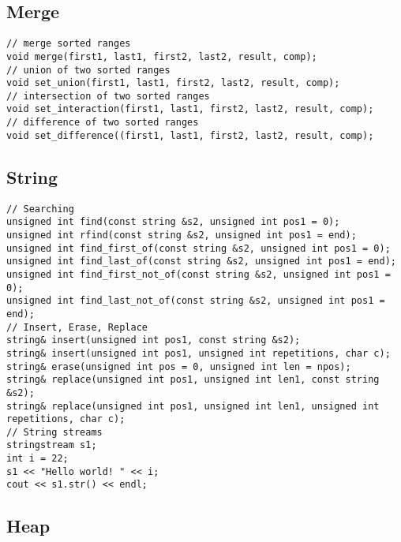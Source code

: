 \documentclass[a4paper]{article}
\begin{document}
\subsection{Merge}

\begin{verbatim}
// merge sorted ranges
void merge(first1, last1, first2, last2, result, comp);
// union of two sorted ranges
void set_union(first1, last1, first2, last2, result, comp);
// intersection of two sorted ranges
void set_interaction(first1, last1, first2, last2, result, comp);
// difference of two sorted ranges
void set_difference((first1, last1, first2, last2, result, comp);
\end{verbatim}

\subsection{String}

\begin{verbatim}
// Searching
unsigned int find(const string &s2, unsigned int pos1 = 0);
unsigned int rfind(const string &s2, unsigned int pos1 = end);
unsigned int find_first_of(const string &s2, unsigned int pos1 = 0);
unsigned int find_last_of(const string &s2, unsigned int pos1 = end);
unsigned int find_first_not_of(const string &s2, unsigned int pos1 = 0);
unsigned int find_last_not_of(const string &s2, unsigned int pos1 = end);
// Insert, Erase, Replace
string& insert(unsigned int pos1, const string &s2);
string& insert(unsigned int pos1, unsigned int repetitions, char c);
string& erase(unsigned int pos = 0, unsigned int len = npos);
string& replace(unsigned int pos1, unsigned int len1, const string &s2);
string& replace(unsigned int pos1, unsigned int len1, unsigned int repetitions, char c);
// String streams
stringstream s1;
int i = 22;
s1 << "Hello world! " << i;
cout << s1.str() << endl;
\end{verbatim}

\subsection{Heap}
\end{document}
